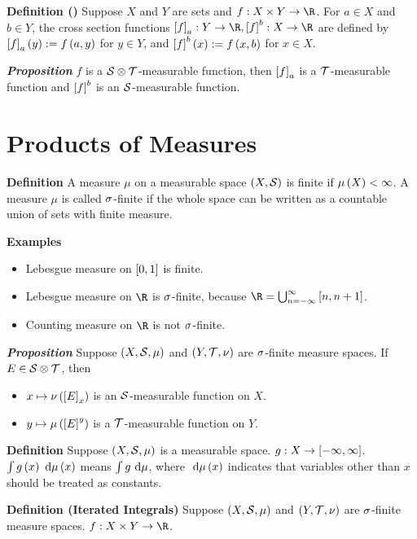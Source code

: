 \documentclass[
]{article}
\begin{document}
\textbf{Definition ()} Suppose \(X\) and \(Y\) are sets and
\(f:X\times Y\to \R\). For \(a\in X\) and \(b\in Y\), the cross section
functions \(\br{f}_a:Y\to \R, \br{f}^b:X\to \R\) are defined by
\(\br{f}_a\pr{y} : = f\pr{a,y}\) for \(y\in Y\), and
\(\br{f}^b\pr{x}:=f\pr{x,b}\) for \(x\in X\).

\emph{\textbf{Proposition}} \(f\) is a \(\S\otimes \T\)-measurable
function, then \(\br{f}_a\) is a \(\T\)-measurable function and
\(\br{f}^b\) is an \(\S\)-measurable function.

\hypertarget{products-of-measures}{%
\section{Products of Measures}\label{products-of-measures}}

\textbf{Definition} A measure \(\mu\) on a measurable space
\(\pr{X,\S}\) is finite if \(\lm{X}<\infty\). A measure \(\mu\) is
called \(\s\)-finite if the whole space can be written as a countable
union of sets with finite measure.

\textbf{Examples}

\begin{itemize}
\item
  Lebesgue measure on \(\br{0,1}\) is finite.
\item
  Lebesgue measure on \(\R\) is \(\s\)-finite, because
  \(\R = \bigcup_{n = -\infty}^{\infty}\br{n,n+1}\).
\item
  Counting measure on \(\R\) is not \(\s\)-finite.
\end{itemize}

\emph{\textbf{Proposition}} Suppose \(\pr{X,\S,\mu}\) and
\(\pr{Y,\T,\nu}\) are \(\s\)-finite measure spaces. If
\(E\in \S\otimes \T\), then

\begin{itemize}
\item
  \(x\mapsto \nu\pr{\br{E}_x}\) is an \(\S\)-measurable function on
  \(X\).
\item
  \(y\mapsto \lm{\br{E}^y}\) is a \(\T\)-measurable function on \(Y\).
\end{itemize}

\textbf{Definition} Suppose \(\pr{X,\S,\mu}\) is a measurable space.
\(g:X\to\br{-\infty,\infty}\). \(\int g\pr{x}\dm\pr{x}\) means
\(\int g\dm\), where \(\dm \pr{x}\) indicates that variables other than
\(x\) should be treated as constants.

\textbf{Definition (Iterated Integrals)} Suppose \(\pr{X,\S,\mu}\) and
\(\pr{Y,\T,\nu}\) are \(\s\)-finite measure spaces.
\(f:X\times Y\to \R\).
\end{document}
